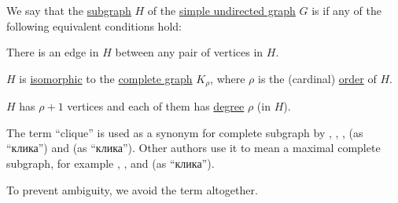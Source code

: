 \begin{definition}\label{def:complete_subgraph}\mimprovised
  We say that the \hyperref[def:undirected_graph/subgraph]{subgraph} \( H \) of the \hyperref[def:undirected_graph]{simple undirected graph} \( G \) is  if any of the following equivalent conditions hold:
  \begin{thmenum}
     There is an edge in \( H \) between any pair of vertices in \( H \).

     \( H \) is \hyperref[def:undirected_graph/homomorphism]{isomorphic} to the \hyperref[def:complete_graph]{complete graph} \( K_\rho \), where \( \rho \) is the (cardinal) \hyperref[def:graph_cardinality/order]{order} of \( H \).

     \( H \) has \( \rho + 1 \) vertices and each of them has \hyperref[def:graph_cardinality/undirected_degree]{degree} \( \rho \) (in \( H \)).
  \end{thmenum}
\end{definition}
\begin{comments}
  \item The term \enquote{clique} is used as a synonym for complete subgraph by , , ,  (as \enquote{клика}) and  (as \enquote{клика}). Other authors use it to mean a maximal complete subgraph, for example , ,  and  (as \enquote{клика}).

  To prevent ambiguity, we avoid the term altogether.
\end{comments}
